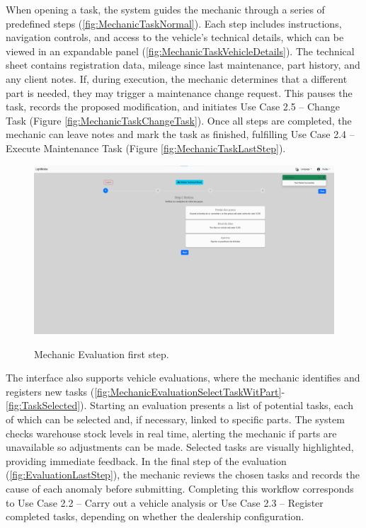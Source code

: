 When opening a task, the system guides the mechanic through a series of predefined steps (\ref{fig:MechanicTaskNormal}). Each step includes instructions, navigation controls, and access to the vehicle's technical details, which can be viewed in an expandable panel (\ref{fig:MechanicTaskVehicleDetails}). The technical sheet contains registration data, mileage since last maintenance, part history, and any client notes. If, during execution, the mechanic determines that a different part is needed, they may trigger a maintenance change request. This pauses the task, records the proposed modification, and initiates Use Case 2.5 – Change Task (Figure \ref{fig:MechanicTaskChangeTask}). Once all steps are completed, the mechanic can leave notes and mark the task as finished, fulfilling Use Case 2.4 – Execute Maintenance Task (Figure \ref{fig:MechanicTaskLastStep}).




\begin{figure}[h]
  \caption{Mechanic Evaluation first step.}
  \centering
  \includegraphics[width=\textwidth]{figs/Implementation/mechanic/MechanicEvaluationNormal}
  \label{fig:MechanicEvaluationNormal}
\end{figure}





The interface also supports vehicle evaluations, where the mechanic identifies and registers new tasks (\ref{fig:MechanicEvaluationSelectTaskWitPart}-\ref{fig:TaskSelected}). Starting an evaluation presents a list of potential tasks, each of which can be selected and, if necessary, linked to specific parts. The system checks warehouse stock levels in real time, alerting the mechanic if parts are unavailable so adjustments can be made. Selected tasks are visually highlighted, providing immediate feedback. In the final step of the evaluation (\ref{fig:EvaluationLastStep}), the mechanic reviews the chosen tasks and records the cause of each anomaly before submitting. Completing this workflow corresponds to Use Case 2.2 – Carry out a vehicle analysis or Use Case 2.3 – Register completed tasks, depending on whether the dealership configuration.


